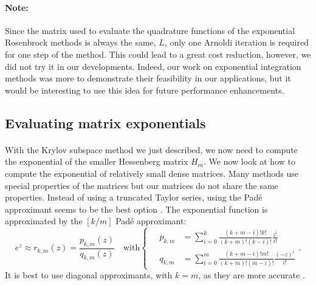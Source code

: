       \paragraph{Note:}
      Since the matrix used to evaluate the quadrature functions of the exponential Rosenbrock methods is always the same, $L$, only one Arnoldi iteration is required for one step of the method.
      This could lead to a great cost reduction, however, we did not try it in our developments.
      Indeed, our work on exponential integration methods was more to demonstrate their feasibility in our applications, but it would be interesting to use this idea for future performance enhancements.


    \subsection{Evaluating matrix exponentials}

      \paragraph{}
      With the Krylov subspace method we just described, we now need to compute the exponential of the smaller Hessenberg matrix $H_m$.
      We now look at how to compute the exponential of relatively small dense matrices.
      Many methods use special properties of the matrices but our matrices do not share the same properties.
      Instead of using a truncated Taylor series, using the Padé approximant seems to be the best option \cite{HighamAlMohy2010}.
      The exponential function is approximated by the $\left[k/m\right]$ Padé approximant:
      \begin{equation}
        e^z \approx r_{k,m}\left(z\right) = \frac{p_{k,m}\left(z\right)}{q_{k,m}\left(z\right)} \quad\textrm{with} \left\{\begin{aligned}
          \quad p_{k,m} &= \sum_{i = 0}^k \frac{\left(k + m - i\right)! k!}{\left(k + m\right)! \left(k - i\right)!} \frac{z^i}{i!} \\
          \quad q_{k,m} &= \sum_{i = 0}^m \frac{\left(k + m - i\right)! m!}{\left(k + m\right)! \left(m - i\right)!} \frac{\left(-z\right)^i}{i!}
        \end{aligned}\right. .
      \end{equation}
      It is best to use diagonal approximants, with $k = m$, as they are more accurate \cite{HighamAlMohy2010}.

